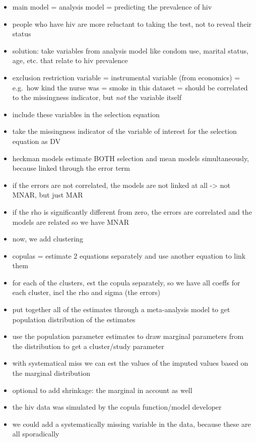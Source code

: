 \documentclass[
]{jss}
\providecommand{\tightlist}{%
  \setlength{\itemsep}{0pt}\setlength{\parskip}{0pt}}
\begin{document}
\begin{itemize}
\tightlist
\item
  main model = analysis model = predicting the prevalence of hiv
\item
  people who have hiv are more reluctant to taking the test, not to
  reveal their status
\item
  solution: take variables from analysis model like condom use, marital
  status, age, etc. that relate to hiv prevalence
\item
  exclusion restriction variable = instrumental variable (from
  economics) = e.g.~how kind the nurse was = smoke in this dataset =
  should be correlated to the missingness indicator, but \emph{not} the
  variable itself
\item
  include these variables in the selection equation
\item
  take the missingness indicator of the variable of interest for the
  selection equation as DV
\item
  heckman models estimate BOTH selection and mean models simultaneously,
  because linked through the error term
\item
  if the errors are not correlated, the models are not linked at all
  -\textgreater{} not MNAR, but just MAR
\item
  if the rho is significantly different from zero, the errors are
  correlated and the models are related so we have MNAR
\item
  now, we add clustering
\item
  copulas = estimate 2 equations separately and use another equation to
  link them
\item
  for each of the clusters, est the copula separately, so we have all
  coeffs for each cluster, incl the rho and sigma (the errors)
\item
  put together all of the estimates through a meta-analysis model to get
  population distribution of the estimates
\item
  use the population parameter estimates to draw marginal parameters
  from the distribution to get a cluster/study parameter
\item
  with systematical miss we can est the values of the imputed values
  based on the marginal distribution
\item
  optional to add shrinkage: the marginal in account as well
\item
  the hiv data was simulated by the copula function/model developer
\item
  we could add a systematically missing variable in the data, because
  these are all sporadically
\end{itemize}
\end{document}
